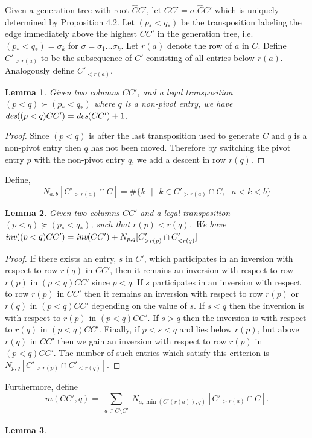 \documentclass[11pt]{amsart}
\newtheorem{lemma}{Lemma}[section]
\begin{document}
{\newline\indent Given a generation tree with root $\widehat{C}C'$, let $CC'=\sigma.\widehat{C}C'$ which is uniquely determined by Proposition 4.2. Let $(p_{*}<q_{*})$ be the transposition labeling the edge immediately above the highest $CC'$ in the generation tree, i.e. $(p_{*}<q_{*})=\sigma_{k}$ for $\sigma=\sigma_{1}\ldots\sigma_{k}$.  Let $r(a)$ denote the row of $a$ in $C$. Define $C'_{>r(a)}$ to be the subsequence of $C'$ consisting of all entries below $r(a)$. Analogously define $C'_{<r(a)}$. 

\begin{lemma}
Given two columns $CC'$, and a legal transposition $(p<q) \succ (p_{*}<q_{*})$ where $q$ is a non-pivot entry, we have $\emph{des}((p<q)CC')=\emph{des}(CC')+1$.
\end{lemma}
\begin{proof}
Since $(p<q)$ is after the last transposition used to generate $C$ and $q$ is a non-pivot entry then $q$ has not been moved. Therefore by switching the pivot entry $p$ with the non-pivot entry $q$, we add a descent in row $r(q)$.
\end{proof}
Define,
\[
N_{a,b}[C'_{>r(a)}\cap C]=\#\{ k \text{ }|\text{ } k\in C'_{>r(a)}\cap C, \text{ } a<k<b\}
\]
\begin{lemma}
Given two columns $CC'$ and a legal transposition $(p<q) \succeq (p_{*}<q_{*})$, such that $r(p)<r(q)$. We have $\emph{inv}((p<q)CC')=\emph{inv}(CC')+N_{p,q}[C'_{>r(p)}\cap C'_{<r(q)}]$
\end{lemma}
\begin{proof}
If there exists an entry, $s$ in $C'$, which participates in an inversion with respect to row $r(q)$ in $CC'$, then it remains an inversion with respect to row $r(p)$ in $(p<q)CC'$ since $p<q$. If $s$ participates in an inversion with respect to row $r(p)$ in $CC'$ then it remains an inversion with respect to row $r(p)$ or $r(q)$ in $(p<q)CC'$ depending on the value of $s$. If $s<q$ then the inversion is with respect to $r(p)$ in $(p<q)CC'$. If $s>q$ then the inversion is with respect to $r(q)$ in $(p<q)CC'$. Finally, if $p<s<q$ and lies below $r(p)$, but above $r(q)$ in $CC'$ then we gain an inversion with respect to row $r(p)$ in $(p<q)CC'$. The number of such entries which satisfy this criterion is $N_{p,q}[C'_{>r(p)}\cap C'_{<r(q)}]$. 
\end{proof}
Furthermore, define
\[
m(CC',q)=\sum_{\substack{a\in C\setminus C'}}N_{a,\min(C'(r(a)),q)}[C'_{>r(a)}\cap C].
\] 
\begin{lemma}

\end{lemma}}
\end{document}
